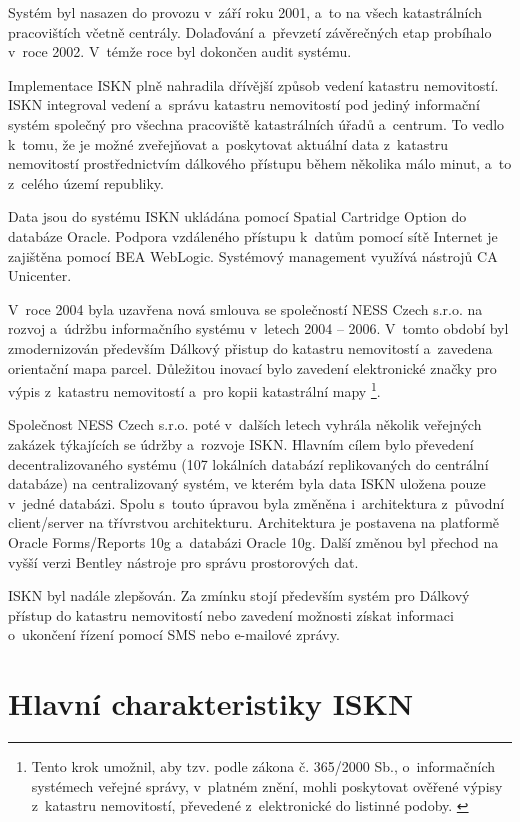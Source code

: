 \documentclass[a4paper,12pt,oneside]{book}
\begin{document}
Systém byl nasazen do provozu v~září roku 2001, a~to na všech
katastrálních pracovištích včetně centrály. Dolaďování a~převzetí
závěrečných etap probíhalo v~roce 2002. V~témže roce byl dokončen
audit systému. \cite{iskn}

Implementace ISKN plně nahradila dřívější způsob vedení katastru
nemovitostí. ISKN integroval vedení a~správu katastru nemovitostí pod
jediný informační systém společný pro všechna pracoviště katastrálních
úřadů a~centrum. To vedlo k~tomu, že je možné zveřejňovat
a~poskytovat aktuální data z~katastru nemovitostí prostřednictvím
dálkového přístupu během několika málo minut, a~to z~celého území
republiky.~\cite{iskn}

Data jsou do systému ISKN ukládána pomocí Spatial Cartridge Option do
databáze Oracle. Podpora vzdáleného přístupu k~datům pomocí sítě
Internet je zajištěna pomocí BEA WebLogic. Systémový management
využívá nástrojů CA Unicenter.~\cite{iskn}

V~roce 2004 byla uzavřena nová smlouva se společností NESS Czech
s.r.o. na rozvoj a~údržbu informačního systému v~letech 2004 --
2006. V~tomto období byl zmodernizován především Dálkový přistup do
katastru nemovitostí a~zavedena orientační mapa parcel. Důležitou
inovací bylo zavedení elektronické značky pro výpis z~katastru
nemovitostí a~pro kopii katastrální mapy \footnote{Tento krok umožnil,
  aby tzv.  podle zákona č. 365/2000 Sb., o~informačních
  systémech veřejné správy, v~platném znění, mohli poskytovat ověřené
  výpisy z~katastru nemovitostí, převedené z~elektronické do listinné
  podoby. \cite{iskn}}. \cite{iskn}

Společnost NESS Czech s.r.o. poté v~dalších letech vyhrála několik
veřejných zakázek týkajících se údržby a~rozvoje ISKN. Hlavním cílem
bylo převedení decentralizovaného systému (107 lokálních databází
replikovaných do centrální databáze) na centralizovaný systém, ve
kterém byla data ISKN uložena pouze v~jedné databázi. Spolu s~touto
úpravou byla změněna i~architektura z~původní client/server na
třívrstvou architekturu. Architektura je postavena na platformě Oracle
Forms/Reports 10g a~databázi Oracle 10g. Další změnou byl přechod na
vyšší verzi Bentley nástroje pro správu prostorových dat. \cite{iskn}

ISKN byl nadále zlepšován. Za zmínku stojí především systém pro
Dálkový přístup do katastru nemovitostí nebo zavedení možnosti získat
informaci o~ukončení řízení pomocí SMS nebo e-mailové
zprávy. \cite{iskn}


\section{Hlavní charakteristiky ISKN}
\end{document}

